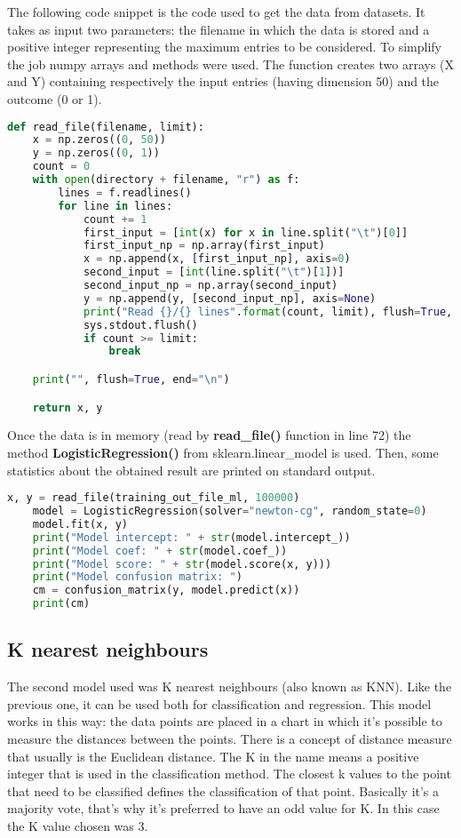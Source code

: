 \documentclass[a4paper,10pt]{memoir}
\begin{document}
The following code snippet is the code used to get the data from datasets. It takes as input two parameters: the filename in which the data is stored and a positive integer representing the maximum entries to be considered. To simplify the job numpy arrays and methods were used. The function creates two arrays (X and Y) containing respectively the input entries (having dimension 50) and the outcome (0 or 1).
\begin{lstlisting}[language=python,firstnumber=24]
def read_file(filename, limit):
    x = np.zeros((0, 50))
    y = np.zeros((0, 1))
    count = 0
    with open(directory + filename, "r") as f:
        lines = f.readlines()
        for line in lines:
            count += 1
            first_input = [int(x) for x in line.split("\t")[0]]
            first_input_np = np.array(first_input)
            x = np.append(x, [first_input_np], axis=0)
            second_input = [int(line.split("\t")[1])]
            second_input_np = np.array(second_input)
            y = np.append(y, [second_input_np], axis=None)
            print("Read {}/{} lines".format(count, limit), flush=True, end="\r")
            sys.stdout.flush()
            if count >= limit:
                break

    print("", flush=True, end="\n")

    return x, y
\end{lstlisting}

Once the data is in memory (read by \textbf{read\_file()} function in line 72) the method \textbf{LogisticRegression()} from sklearn.linear\_model is used. Then, some statistics about the obtained result are printed on standard output.
\begin{lstlisting}[language=python,firstnumber=72]
    x, y = read_file(training_out_file_ml, 100000)
    model = LogisticRegression(solver="newton-cg", random_state=0)
    model.fit(x, y)
    print("Model intercept: " + str(model.intercept_))
    print("Model coef: " + str(model.coef_))
    print("Model score: " + str(model.score(x, y)))
    print("Model confusion matrix: ")
    cm = confusion_matrix(y, model.predict(x))
    print(cm)
\end{lstlisting}


\subsection{K nearest neighbours}
The second model used was K nearest neighbours (also known as KNN). Like the previous one, it can be used both for classification and regression. This model works in this way: the data points are placed in a chart in which it's possible to measure the distances between the points. There is a concept of distance measure that usually is the Euclidean distance. The K in the name means a positive integer that is used in the classification method. The closest k values to the point that need to be classified defines the classification of that point. Basically it's a majority vote, that's why it's preferred to have an odd value for K. In this case the K value chosen was 3.
\medskip
\end{document}
